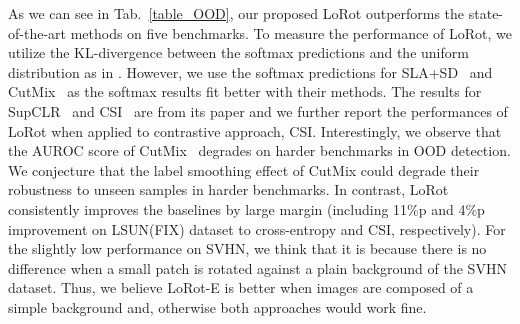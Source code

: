 As we can see in Tab.~\ref{table_OOD}, our proposed LoRot outperforms the state-of-the-art methods on five benchmarks. 
To measure the performance of LoRot, we utilize the KL-divergence between the softmax predictions and the uniform distribution as in \cite{hendrycks2018deep, hendrycks2019using}.
However, we use the softmax predictions for SLA+SD~\cite{lee2020self} and CutMix~\cite{yun2019cutmix} as the softmax results fit better with their methods. 
The results for SupCLR~\cite{khosla2020supervised} and CSI~\cite{tack2020csi} are from its paper and we further report the performances of LoRot when applied to contrastive approach, CSI.
Interestingly, we observe that the AUROC score of CutMix~\cite{yun2019cutmix} degrades on harder benchmarks in OOD detection.
We conjecture that the label smoothing effect of CutMix could degrade their robustness to unseen samples in harder benchmarks.
In contrast, LoRot consistently improves the baselines by large margin
(including 11\%p and 4\%p improvement on LSUN(FIX) dataset to cross-entropy and CSI, respectively).
For the slightly low performance on SVHN, we think that it is because there is no difference when a small patch is rotated against a plain background of the SVHN dataset.
Thus, we believe LoRot-E is better when images are composed of a simple background and, otherwise both approaches would work fine.


























